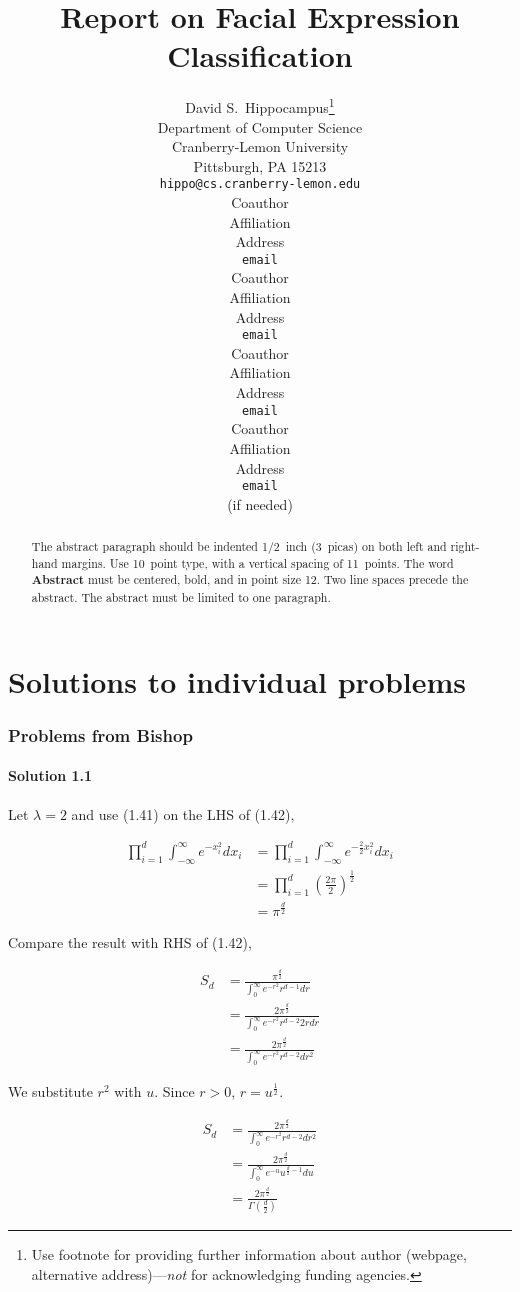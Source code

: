 \documentclass{article} %
\title{Report on Facial Expression Classification}
\author{
David S.~Hippocampus\thanks{ Use footnote for providing further information
about author (webpage, alternative address)---\emph{not} for acknowledging
funding agencies.} \\
Department of Computer Science\\
Cranberry-Lemon University\\
Pittsburgh, PA 15213 \\
\texttt{hippo@cs.cranberry-lemon.edu} \\
\And
Coauthor \\
Affiliation \\
Address \\
\texttt{email} \\
\AND
Coauthor \\
Affiliation \\
Address \\
\texttt{email} \\
\And
Coauthor \\
Affiliation \\
Address \\
\texttt{email} \\
\And
Coauthor \\
Affiliation \\
Address \\
\texttt{email} \\
(if needed)\\
}
\begin{document}
\maketitle

\begin{abstract}
The abstract paragraph should be indented 1/2~inch (3~picas) on both left and
right-hand margins. Use 10~point type, with a vertical spacing of 11~points.
The word \textbf{Abstract} must be centered, bold, and in point size 12. Two
line spaces precede the abstract. The abstract must be limited to one
paragraph.
\end{abstract}

\part{Solutions to individual problems}
\section{Problems from Bishop}

\subsection{Solution 1.1}

Let $\lambda=2$ and use (1.41) on the LHS of (1.42),

\begin{align*} 
    \prod_{i=1}^{d}\int_{-\infty}^{\infty}e^{-x_i^2}dx_i &= \prod_{i=1}^{d}\int_{-\infty}^{\infty}e^{-\frac{2}{2}x_i^2}dx_i \\
    &= \prod_{i=1}^{d}(\frac{2\pi}{2})^{\frac{1}{2}} \\
    &= \pi^{\frac{d}{2}}
\end{align*} 

Compare the result with RHS of (1.42),

\begin{align*} 
    S_d &= \frac{\pi^{\frac{d}{2}}}{\int_{0}^{\infty}e^{-r^2}r^{d-1}dr} \\
    &= \frac{2 \pi^{\frac{d}{2}}}{\int_{0}^{\infty}e^{-r^2}r^{d-2}2r dr} \\
    &= \frac{2 \pi^{\frac{d}{2}}}{\int_{0}^{\infty}e^{-r^2}r^{d-2}dr^2}
\end{align*} 

We substitute $r^2$ with $u$. Since $r>0$, $r=u^{\frac{1}{2}}$.

\begin{align*} 
    S_d &= \frac{2 \pi^{\frac{d}{2}}}{\int_{0}^{\infty}e^{-r^2}r^{d-2}dr^2} \\
        &= \frac{2 \pi^{\frac{d}{2}}}{\int_{0}^{\infty}e^{-u}u^{\frac{d}{2}-1}du} \\
        &= \frac{2 \pi^{\frac{d}{2}}}{\Gamma(\frac{d}{2})}
\end{align*} 
\end{document}
